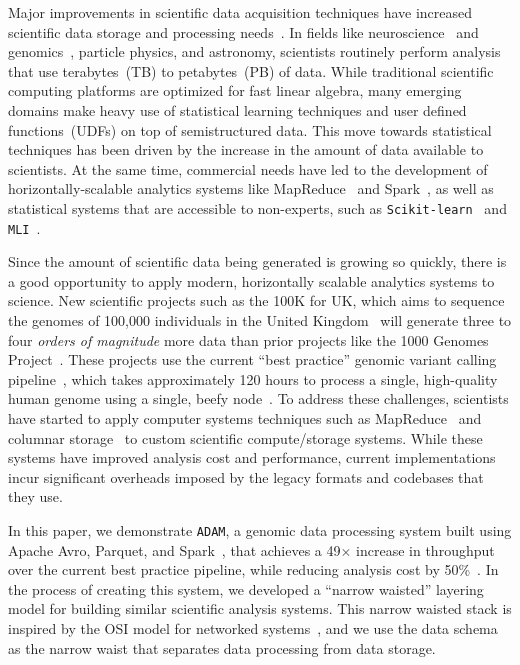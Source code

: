 \documentclass{acm_proc_article-sp}
\begin{document}
Major improvements in scientific data acquisition techniques have increased scientific data storage and
processing \linebreak needs~\cite{cunningham14, schadt10}. In fields like
neuroscience~\cite{freeman14} and \linebreak genomics~\cite{stein10}, particle physics, and astronomy,
scientists routinely perform analysis that use terabytes~(TB) to \linebreak petabytes~(PB) of data.
While traditional scientific computing platforms are optimized for fast linear algebra, many emerging
domains make heavy use of statistical learning techniques and user defined functions~(UDFs) on top of
semistructured data. This move towards statistical techniques has been driven by the increase in the
amount of data available to scientists. At the same time, commercial needs have led to the development of
horizontally-scalable analytics systems like MapReduce~\cite{dean04, dean08} and Spark~\cite{zaharia10}, as
well as statistical systems that are accessible to non-experts, such as \texttt{Scikit-learn}~\cite{pedregosa11} and
\texttt{MLI}~\cite{sparks13}.

Since the amount of scientific data being generated is growing so quickly, there is a good opportunity to apply
modern, horizontally scalable analytics systems to science. New scientific
projects such as the 100K for UK, which aims to sequence the genomes of 100,000 individuals in the
United Kingdom~\cite{uk100k} will generate three to four \emph{orders of magnitude} more data than
prior projects like the 1000 Genomes Project~\cite{siva08}. These projects use the current ``best
practice'' genomic variant calling pipeline~\cite{auwera13}, which takes approximately 120 hours to
process a single, high-quality human genome using a single, beefy node~\cite{talwalkar14}. To address
these challenges, scientists have started to apply computer systems techniques such as
MapReduce~\cite{langmead09, mckenna10, schatz09} and columnar storage~\cite{fritz11} to custom
scientific compute/storage systems. While these systems have improved analysis cost and performance,
current implementations incur significant overheads imposed by the legacy formats and
codebases that they use.

In this paper, we demonstrate \texttt{ADAM}, a genomic data processing system built using Apache Avro, Parquet, and
Spark~\cite{avro, parquet, zaharia10}, that achieves a 49$\times$ increase in throughput over the current best
practice pipeline, while reducing analysis cost by 50\%~\cite{massie13}. In the process of creating this
system, we developed a ``narrow waisted'' layering model for building similar scientific analysis systems.
This narrow waisted stack is inspired by the OSI model for networked systems~\cite{zimmermann80}, and we
use the data schema as the narrow waist that separates data processing from data storage.
\end{document}
